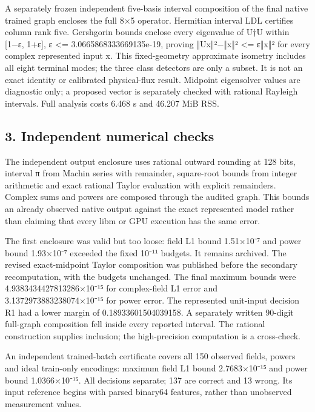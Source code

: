 \documentclass[
  10pt,
]{article}
\begin{document}
A separately frozen independent five-basis interval composition of the
final native trained graph encloses the full 8×5 operator. Hermitian
interval LDL certifies column rank five. Gershgorin bounds enclose every
eigenvalue of U†U within {[}1−ε, 1+ε{]}, ε \textless=
3.0665868333669135e-19, proving \textbar‖Ux‖²−‖x‖²\textbar{} \textless=
ε‖x‖² for every complex represented input x. This fixed-geometry
approximate isometry includes all eight terminal modes; the three class
detectors are only a subset. It is not an exact identity or calibrated
physical-flux result. Midpoint eigensolver values are diagnostic only; a
proposed vector is separately checked with rational Rayleigh intervals.
Full analysis costs 6.468 s and 46.207 MiB RSS.

\hypertarget{independent-numerical-checks}{%
\subsection{3. Independent numerical
checks}\label{independent-numerical-checks}}

The independent output enclosure uses rational outward rounding at 128
bits, interval π from Machin series with remainder, square-root bounds
from integer arithmetic and exact rational Taylor evaluation with
explicit remainders. Complex sums and powers are composed through the
audited graph. This bounds an already observed native output against the
exact represented model rather than claiming that every libm or GPU
execution has the same error.

The first enclosure was valid but too loose: field L1 bound 1.51×10⁻⁷
and power bound 1.93×10⁻⁷ exceeded the fixed 10⁻¹¹ budgets. It remains
archived. The revised exact-midpoint Taylor composition was published
before the secondary recomputation, with the budgets unchanged. The
final maximum bounds were 4.9383434427813286×10⁻¹⁵ for complex-field L1
error and 3.1372973883238074×10⁻¹⁵ for power error. The represented
unit-input decision R1 had a lower margin of 0.18933601504039158. A
separately written 90-digit full-graph composition fell inside every
reported interval. The rational construction supplies inclusion; the
high-precision computation is a cross-check.

An independent trained-batch certificate covers all 150 observed fields,
powers and ideal train-only encodings: maximum field L1 bound
2.7683×10⁻¹⁵ and power bound 1.0366×10⁻¹⁵. All decisions separate; 137
are correct and 13 wrong. Its input reference begins with parsed
binary64 features, rather than unobserved measurement values.
\end{document}
